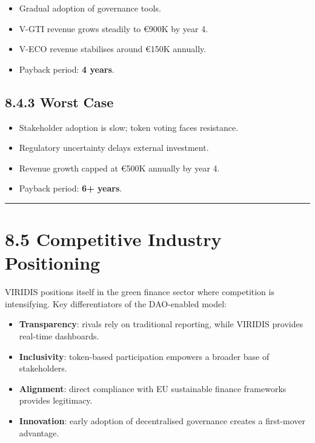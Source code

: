 \documentclass[
  english,
  12pt,
  oneside,
  open=any]{scrbook}
\providecommand{\tightlist}{%
  \setlength{\itemsep}{0pt}\setlength{\parskip}{0pt}}\usepackage{longtable,booktabs,array}
\begin{document}
\begin{itemize}
\tightlist
\item
  Gradual adoption of governance tools.\\
\item
  V-GTI revenue grows steadily to €900K by year 4.\\
\item
  V-ECO revenue stabilises around €150K annually.\\
\item
  Payback period: \textbf{4 years}.
\end{itemize}

\subsection{8.4.3 Worst Case}\label{sec-worst}

\begin{itemize}
\tightlist
\item
  Stakeholder adoption is slow; token voting faces resistance.\\
\item
  Regulatory uncertainty delays external investment.\\
\item
  Revenue growth capped at €500K annually by year 4.\\
\item
  Payback period: \textbf{6+ years}.
\end{itemize}

\begin{center}\rule{0.5\linewidth}{0.5pt}\end{center}

\section{8.5 Competitive Industry Positioning}\label{sec-competitive}

VIRIDIS positions itself in the green finance sector where competition
is intensifying. Key differentiators of the DAO-enabled model:

\begin{itemize}
\tightlist
\item
  \textbf{Transparency}: rivals rely on traditional reporting, while
  VIRIDIS provides real-time dashboards.\\
\item
  \textbf{Inclusivity}: token-based participation empowers a broader
  base of stakeholders.\\
\item
  \textbf{Alignment}: direct compliance with EU sustainable finance
  frameworks provides legitimacy.\\
\item
  \textbf{Innovation}: early adoption of decentralised governance
  creates a first-mover advantage.
\end{itemize}
\end{document}
